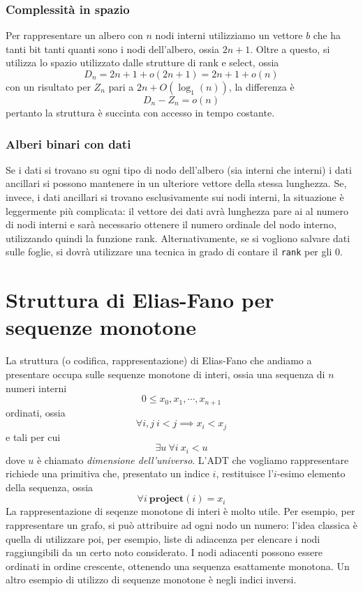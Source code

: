 \subsubsection{Complessità in spazio}
Per rappresentare un albero con $n$ nodi interni utilizziamo un vettore $b$ che ha tanti
bit tanti quanti sono i nodi dell'albero, ossia $2n +1$. Oltre a questo, si utilizza
lo spazio utilizzato dalle strutture di rank e select, ossia
$$
	D_n = 2n +1 + o(2n+1) = 2n + 1 + o(n)
$$
con un risultato per $Z_n$ pari a $2n + O(\log_1(n))$, la differenza è
$$
	D_n - Z_n = o(n)
$$
pertanto la struttura è succinta con accesso in tempo costante.

\subsubsection{Alberi binari con dati}
Se i dati si trovano su ogni tipo di nodo dell'albero (sia interni che interni) i dati
ancillari si possono mantenere in un ulteriore vettore della stessa lunghezza.
Se, invece, i dati ancillari si trovano esclusivamente sui nodi interni, 
la situazione è leggermente più complicata: il vettore dei dati avrà 
lunghezza pare ai al numero di nodi interni e sarà necessario ottenere il numero 
ordinale del nodo interno, utilizzando quindi la funzione rank. 
Alternativamente, se si vogliono salvare dati sulle foglie, si dovrà utilizzare 
una tecnica in grado di contare il \texttt{rank} per gli $0$.

\section{Struttura di Elias-Fano per sequenze monotone}
La struttura (o codifica, rappresentazione) di Elias-Fano che andiamo 
a presentare occupa sulle sequenze monotone di interi, ossia 
una sequenza di $n$ numeri interni
$$
	0 \leq x_0, x_1, \cdots, x_{n+1}
$$
ordinati, ossia
$$
\forall i, j ~ i < j \implies x_i < x_j
$$
e tali per cui 
$$
\exists u ~ \forall i ~ x_i < u
$$
dove $u$ è chiamato \textit{dimensione dell'universo}.
L'ADT che vogliamo rappresentare richiede una primitiva
che, presentato un indice $i$, restituisce l'$i$-esimo elemento della sequenza, 
ossia
$$
\forall i ~ \mathbf{project}(i) = x_i
$$
La rappresentazione di seqenze monotone di interi è molto utile. 
Per esempio, per rappresentare un grafo, si può attribuire ad ogni 
nodo un numero: l'idea classica è quella di utilizzare poi, per esempio, 
liste di adiacenza per elencare i nodi raggiungibili da un certo noto 
considerato. I nodi adiacenti possono essere ordinati in ordine crescente, 
ottenendo una sequenza esattamente monotona. 
Un altro esempio di utilizzo di sequenze monotone è negli indici inversi. 



